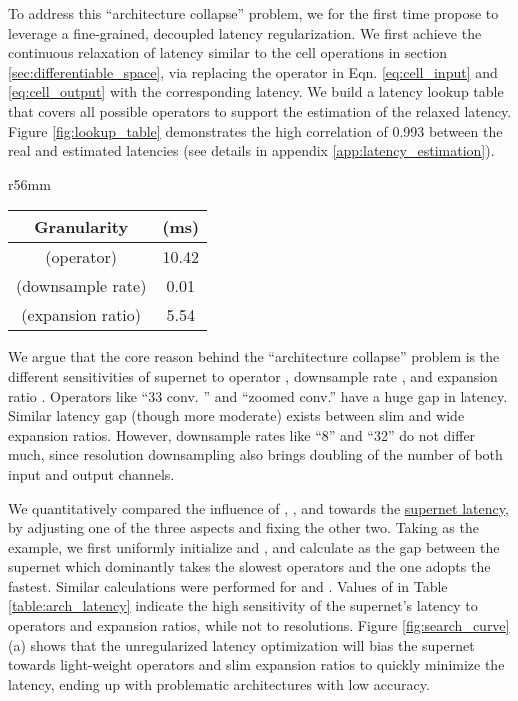 \documentclass{article} \usepackage{iclr2020_conference,times}
\begin{document}
To address this ``architecture collapse'' problem, we for the first time propose to leverage a fine-grained, decoupled latency regularization. We first achieve the continuous relaxation of latency similar to the cell operations in section \ref{sec:differentiable_space}, via replacing the operator  in Eqn. \ref{eq:cell_input} and \ref{eq:cell_output} with the corresponding latency. We build a latency lookup table that covers all possible operators to support the estimation of the relaxed latency. Figure \ref{fig:lookup_table} demonstrates the high correlation of 0.993 between the real and estimated latencies (see details in appendix \ref{app:latency_estimation}).

\begin{wraptable}{r}{56mm}
\vspace{-1.2em}
\footnotesize
\begin{center}
\caption{Supernet's sensitivity to latency under different granularities. Input size: (1, 3, 1024, 2048).}
\begin{tabular}{cc}\toprule
Granularity &  (ms) \\ \midrule
 (operator) & 10.42 \\
 (downsample rate) & 0.01 \\
 (expansion ratio) & 5.54 \\ \bottomrule
\end{tabular}\label{table:arch_latency}
\end{center}\vspace{-1.2em}
\end{wraptable}

We argue that the core reason behind the ``architecture collapse'' problem is the different sensitivities of supernet to operator , downsample rate , and expansion ratio  . Operators like ``33 conv. '' and ``zoomed conv.'' have a huge gap in latency. Similar latency gap (though more moderate) exists between slim and wide expansion ratios. However, downsample rates like ``8'' and ``32'' do not differ much, since resolution downsampling also brings doubling of the number of both input and output channels.

We quantitatively compared the influence of , , and  towards the \underline{supernet latency}, by adjusting one of the three aspects and fixing the other two. Taking  as the example, we first uniformly initialize  and , and calculate  as the gap between the supernet which dominantly takes the slowest operators and the one adopts the fastest.
Similar calculations were performed for  and . Values of  in Table \ref{table:arch_latency} indicate the high sensitivity of the supernet's latency to operators and expansion ratios, while not to resolutions. Figure \ref{fig:search_curve}(a) shows that the unregularized latency optimization will bias the supernet towards light-weight operators and slim expansion ratios to quickly minimize the latency, ending up with problematic architectures with low accuracy.
\end{document}
